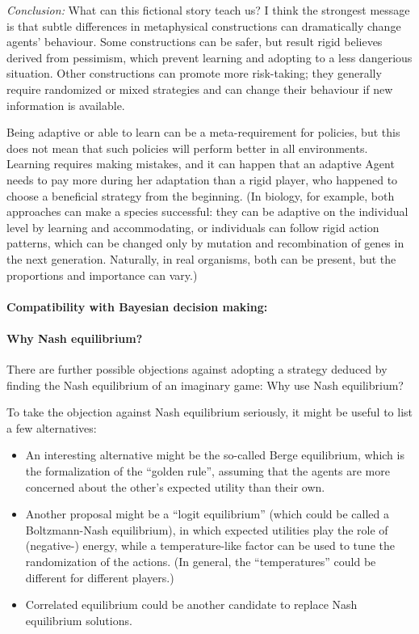 \documentclass{article}
\begin{document}
{\it Conclusion:}
What can this fictional story teach us? I think the strongest message is that subtle differences in metaphysical constructions can dramatically change agents' behaviour.
Some constructions can be safer, but result rigid believes derived from pessimism, which prevent learning and adopting to a less dangerious situation.
Other constructions can promote more risk-taking; they generally require randomized or mixed strategies and can change their behaviour if new information is available.

Being adaptive or able to learn can be a meta-requirement for policies, but this does not mean that such policies will perform better in all environments.
Learning requires making mistakes, and it can happen that an adaptive Agent needs to pay more during her adaptation than a rigid player, who happened to choose a beneficial strategy from the beginning.
(In biology, for example, both approaches can make a species successful: they can be adaptive on the individual level by learning and accommodating, or individuals can follow rigid action patterns, which can be changed only by mutation and recombination of genes in the next generation. Naturally, in real organisms, both can be present, but the proportions and importance can vary.)

\paragraph{Compatibility with Bayesian decision making:}



\paragraph{Why Nash equilibrium?}
There are further possible objections against adopting a strategy deduced by finding the Nash equilibrium of an imaginary game:
Why use Nash equilibrium?

To take the objection against Nash equilibrium seriously, it might be useful to list a few alternatives:
\begin{itemize}
    \item An interesting alternative might be the so-called Berge equilibrium, which is the formalization of the ``golden rule'', assuming that the agents are more concerned about the other's expected utility than their own.
    \item Another proposal might be a ``logit equilibrium'' (which could be called a Boltzmann-Nash equilibrium), in which expected utilities play the role of (negative-) energy, while a temperature-like factor can be used to tune the randomization of the actions. (In general, the ``temperatures'' could be different for different players.)
    \item Correlated equilibrium could be another candidate to replace Nash equilibrium solutions.
\end{itemize}
\end{document}
